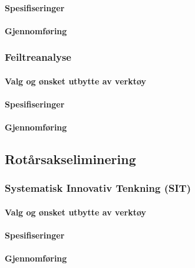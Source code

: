 \paragraph{Spesifiseringer}


\paragraph{Gjennomføring}



\subsubsection{Feiltreanalyse}

\paragraph{Valg og ønsket utbytte av verktøy}


\paragraph{Spesifiseringer}


\paragraph{Gjennomføring}



\subsection{Rotårsakseliminering}

\subsubsection{Systematisk Innovativ Tenkning (SIT)}

\paragraph{Valg og ønsket utbytte av verktøy}


\paragraph{Spesifiseringer}


\paragraph{Gjennomføring}



